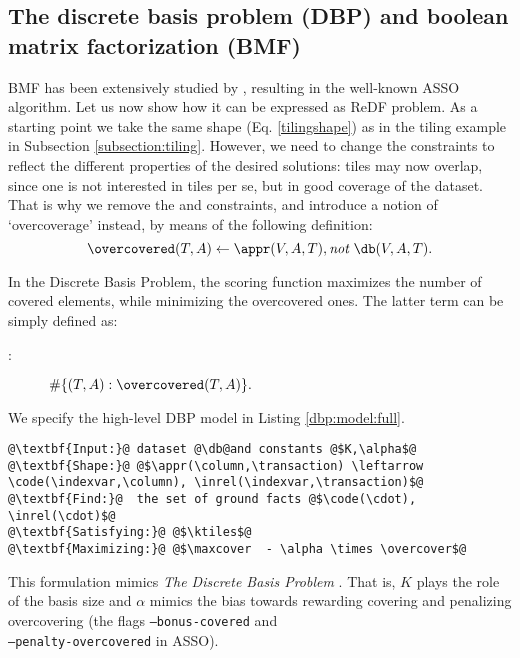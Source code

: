 \subsection{The discrete basis problem (DBP) and boolean matrix factorization (BMF)}
\label{subsection:bmf}
BMF has been extensively studied by \cite{conf/icdm/Miettinen12}, resulting in the well-known ASSO algorithm. Let us now show how it can be expressed as ReDF problem. As a starting point we take the same shape (Eq. \ref{tilingshape}) as in the tiling example in Subsection \ref{subsection:tiling}. However, we need to change the constraints to reflect the different properties of the desired solutions: tiles may now overlap, since one is not interested in tiles per se, but in good coverage of the dataset. That is why we remove 
the \intersectionConstraint and \overcoverageConstraint constraints, and introduce a notion of `overcoverage' instead, by means of the following definition:
\begin{equation*}
\overcovered(T,A) \leftarrow  \appr(V,A,T), \textit{not}~ \db(V,A,T). %
\end{equation*}

In the Discrete Basis Problem, the scoring function maximizes the number of covered elements, while minimizing the overcovered ones. The latter term can be simply defined as: 
\begin{description}
\item[\overcoverage:] $\#\{ (T,A) : \overcovered(T,A) \}. $
\end{description}
We specify the high-level DBP model in Listing \ref{dbp:model:full}.
\begin{lstlisting}[style=model, caption=ReDF Model for the Discrete Basis Problem, label=dbp:model:full]
@\textbf{Input:}@ dataset @\db@and constants @$K,\alpha$@
@\textbf{Shape:}@ @$\appr(\column,\transaction) \leftarrow \code(\indexvar,\column), \inrel(\indexvar,\transaction)$@
@\textbf{Find:}@  the set of ground facts @$\code(\cdot), \inrel(\cdot)$@
@\textbf{Satisfying:}@ @$\ktiles$@
@\textbf{Maximizing:}@ @$\maxcover  - \alpha \times \overcover$@
\end{lstlisting}
This formulation mimics \textit{The Discrete Basis Problem} \parencite{dbp}. That is, $K$ plays the role of the basis size and $\alpha$ mimics the bias towards rewarding covering and penalizing overcovering (the flags \texttt{--bonus-covered} and\\\texttt{--penalty-overcovered} in ASSO).

